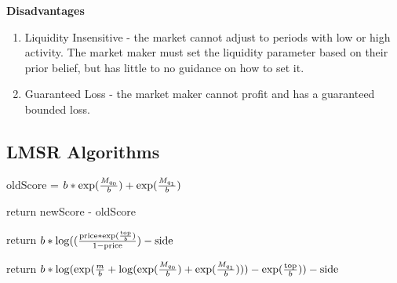 \textbf{Disadvantages} \\
\begin{enumerate}
\item{Liquidity Insensitive - the market cannot adjust to periods with low or high activity. The market maker must set the liquidity parameter based on their prior belief, but has little to no guidance on how to set it.}
\item{Guaranteed Loss - the market maker cannot profit and has a guaranteed bounded loss.}
\end{enumerate}

\subsection{LMSR Algorithms}
\begin{algorithm}[H]
\SetAlgoLined
{}
oldScore = $b * \exp(\frac{M_{q_0}}{b}) + \exp(\frac{M_{q_1}}{b})$\;

return newScore - oldScore\;
\end{algorithm}

\begin{algorithm}[H]
\SetAlgoLined
{}
return $b * \log((\frac{\text{price}*\exp(\frac{\text{top}}{b})}{1-\text{price}}) - \text{side}$\;
\end{algorithm}

\begin{algorithm}[H]
return $b * 
\log(
	\exp(
		\frac{m}{b} + 
		\log(
			\exp(\frac{M_{q_0}}{b}) + 
			\exp(\frac{M_{q_1}}{b})
		)
	) - 
	\exp(\frac{\text{top}}{b}
	)
) - \text{side}$\;
\end{algorithm}

